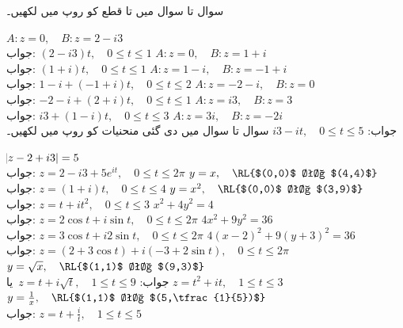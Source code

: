 سوال  تا سوال  میں  تا  قطع کو  روپ میں لکھیں۔

\quad
$A:z=0,\quad B:z=2-i3$\\
جواب:\quad
$(2-i3)t,\quad 0\le t\le 1$
\quad
$A:z=0,\quad B:z=1+i$\\
جواب:\quad
$(1+i)t,\quad 0\le t\le 1$
\quad
$A:z=1-i,\quad B:z=-1+i$\\
جواب:\quad
$1-i+(-1+i)t,\quad 0\le t\le 2$
\quad
$A:z=-2-i,\quad B:z=0$\\
جواب:\quad
$-2-i+(2+i)t,\quad 0\le t\le 1$
\quad
$A:z=i3,\quad B:z=3$\\
جواب:\quad
$i3+(1-i)t,\quad 0\le t\le 3$
\quad
$A:z=3i,\quad B:z=-2i$\\
جواب:\quad
$i3-it,\quad 0\le t\le 5$
سوال  تا سوال  میں دی گئی منحنیات کو  روپ میں لکھیں۔

\quad
$\abs{z-2+i3}=5$\\
جواب:\quad
$z=2-i3+5e^{it},\quad 0\le t\le 2\pi$
\quad
$y=x,\quad \text{\RL{$(0,0)$ تا $(4,4)$}}$\\
جواب:\quad
$z=(1+i)t,\quad 0\le t\le 4$
\quad
$y=x^2,\quad \text{\RL{$(0,0)$ تا $(3,9)$}}$\\
جواب:\quad
$z=t+it^2,\quad 0\le t\le 3$
\quad
$x^2+4y^2=4$\\
جواب:\quad
$z=2\cos t+i\sin t,\quad 0\le t\le 2\pi$
\quad
$4x^2+9y^2=36$\\
جواب:\quad
$z=3\cos t+i2\sin t,\quad 0\le t\le 2\pi$
\quad
$4(x-2)^2+9(y+3)^2=36$\\
جواب:\quad
$z=(2+3\cos t)+i(-3+2\sin t),\quad 0\le t\le 2\pi$
\quad
$y=\sqrt{x},\quad \text{\RL{$(1,1)$ تا $(9,3)$}}$\\
جواب:\quad
$\,z=t+i\sqrt{t},\quad 1\le t\le 9$
یا
$z=t^2+it,\quad 1\le t\le 3\,$
\quad
$y=\tfrac{1}{x},\quad \text{\RL{$(1,1)$ تا $(5,\tfrac{1}{5})$}}$\\
جواب:\quad
$z=t+\tfrac{i}{t},\quad 1\le t\le 5$

